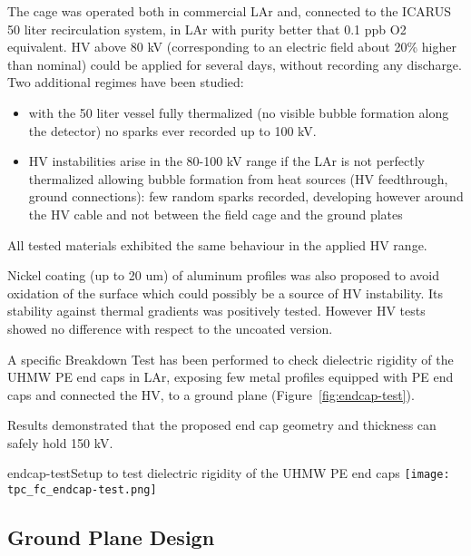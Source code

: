 The cage was operated both in commercial LAr and, connected to the ICARUS 50 liter recirculation system, in LAr  with purity  better that 0.1 ppb O2 equivalent. HV above 80 kV (corresponding to an electric field about 20\% higher than nominal) could be applied for several days, without recording any discharge. Two additional regimes have been studied:
\begin{itemize}	
\item  with the 50 liter vessel fully thermalized (no visible bubble formation along the detector) no sparks ever recorded up to 100 kV.
\item  HV instabilities arise in the 80-100 kV range if the LAr is not perfectly thermalized allowing bubble formation from heat sources (HV feedthrough, ground connections): few random sparks recorded, developing however around the HV cable and not between the field cage and the ground plates
\end{itemize}

All tested materials exhibited the same behaviour in the applied HV range. 

Nickel coating (up to 20 um) of aluminum profiles was also proposed  to avoid oxidation of the surface which could possibly be a source of HV instability. Its stability against  thermal gradients was positively tested. However HV tests showed no difference with respect to the uncoated version.

A specific Breakdown Test has been performed to check dielectric rigidity of the UHMW PE end caps in LAr, exposing few metal profiles equipped with PE end caps and connected the HV, to a ground plane (Figure~\ref{fig:endcap-test}).

Results demonstrated that the proposed end cap geometry and thickness can safely hold 150 kV.

\begin{cdrfigure}{endcap-test}{Setup to test dielectric rigidity of the UHMW PE end caps}
\texttt{[image: tpc\_fc\_endcap-test.png]}
\end{cdrfigure}





\subsection{Ground Plane Design}

